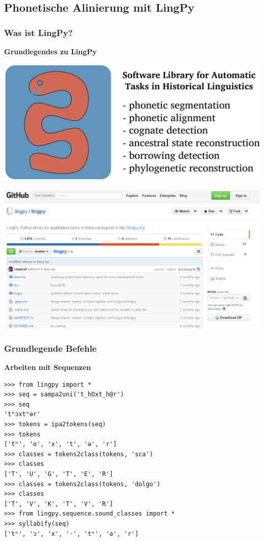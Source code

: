 \subsection{Phonetische Alinierung mit LingPy}
\subsubsection{\texorpdfstring{{Was ist LingPy?}}{Was ist LingPy?}}

\par\noindent\textbf{Grundlegendes zu LingPy}

\includegraphics[width=\textwidth]{img/lingpy.pdf}






\includegraphics[width=\textwidth]{img/lingpy-git.png}


\subsubsection{\texorpdfstring{{Grundlegende
Befehle}}{Grundlegende Befehle}}

\par\noindent\textbf{Arbeiten mit Sequenzen}

\begin{verbatim}
>>> from lingpy import *
>>> seq = sampa2uni('t_hOxt_h@r')
>>> seq
'tʰɔxtʰər'
>>> tokens = ipa2tokens(seq)
>>> tokens
['tʰ', 'o', 'x', 't', 'ə', 'r']
>>> classes = tokens2class(tokens, 'sca')
>>> classes
['T', 'U', 'G', 'T', 'E', 'R']
>>> classes = tokens2class(tokens, 'dolgo')
>>> classes
['T', 'V', 'K', 'T', 'V', 'R']
>>> from lingpy.sequence.sound_classes import *
>>> syllabify(seq)
['tʰ', 'ɔ', 'x', '◦', 'tʰ', 'ə', 'r']
\end{verbatim}




